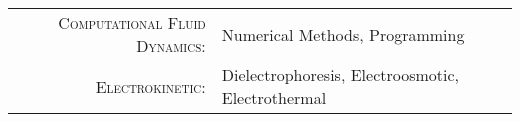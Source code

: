 \begin{tabular}{rl}
   \textsc{Computational Fluid Dynamics:} & Numerical Methods, Programming} \\
   \textsc{Electrokinetic:} & Dielectrophoresis, Electroosmotic, Electrothermal \\
\end{tabular}